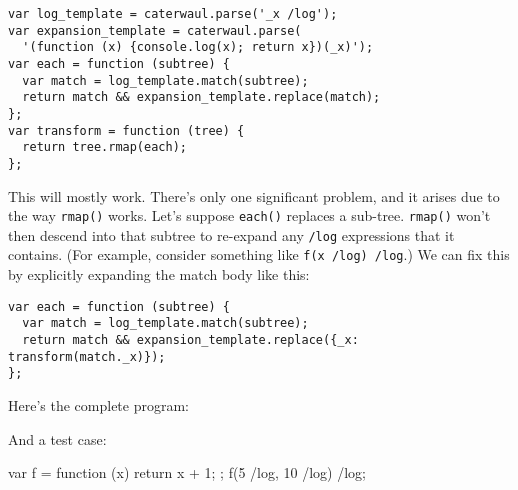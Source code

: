 \documentclass{report}
\begin{document}
\begin{verbatim}
var log_template = caterwaul.parse('_x /log');
var expansion_template = caterwaul.parse(
  '(function (x) {console.log(x); return x})(_x)');
var each = function (subtree) {
  var match = log_template.match(subtree);
  return match && expansion_template.replace(match);
};
var transform = function (tree) {
  return tree.rmap(each);
};
\end{verbatim}

    This will mostly work. There's only one significant problem, and it arises due to the way {\tt rmap()} works. Let's suppose {\tt each()} replaces a sub-tree. {\tt rmap()} won't then
    descend into that subtree to re-expand any {\tt /log} expressions that it contains. (For example, consider something like {\tt f(x /log) /log}.) We can fix this by explicitly expanding the
    match body like this:

\begin{verbatim}
var each = function (subtree) {
  var match = log_template.match(subtree);
  return match && expansion_template.replace({_x: transform(match._x)});
};
\end{verbatim}

    Here's the complete program:


    And a test case:

\begin{resourcecode}
var f = function (x) {
  return x + 1;
};
f(5 /log, 10 /log) /log; \end{resourcecode}
\end{document}
